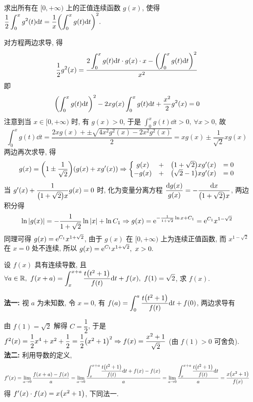 \begin{example}
    求出所有在 $[0,+\infty)$ 上的正值连续函数 $g(x)$, 使得 $\displaystyle\dfrac{1}{2}\int_{0}^{x}g^2(t)\dd t=\dfrac{1}{x}\qty(\int_{0}^{x}g(t)\dd t)^2.$
\end{example}
\begin{solution}
    对方程两边求导, 得 $$\dfrac{1}{2}g^2(x)=\dfrac{2\displaystyle\int_{0}^{x}g(t)\dd t\cdot g(x)\cdot x-\qty(\displaystyle\int_{0}^{x}g(t)\dd t)^2}{x^2}$$
    即 $$\qty(\int_{0}^{x}g(t)\dd t)^2-2xg(x)\int_{0}^{x}g(t)\dd t+\dfrac{x^2}{2}g^2(x)=0$$
    注意到当 $x\in[0,+\infty)$ 时, 有 $g(x)>0$, 于是 $\displaystyle\int_{0}^{x}g(t)\dd t>0,~\forall x>0$, 
    故 $$\int_{0}^{x}g(t)\dd t=\dfrac{2xg(x)+\pm\sqrt{4x^2g^2(x)-2x^2g^2(x)}}{2}=xg(x)\pm\dfrac{1}{\sqrt{2}}xg(x)$$
    两边再次求导, 得 $$g(x)=\qty(1\pm\dfrac{1}{\sqrt{2}})(g(x)+xg'(x))\Rightarrow\left\{\begin{matrix}
            g(x)  & + & \qty(1+\sqrt2)xg'(x) & =0 \\
            -g(x) & + & \qty(\sqrt2-1)xg'(x) & =0
        \end{matrix}\right.$$
    当 $g'(x)+\dfrac{1}{\qty(1+\sqrt{2})x}g(x)=0$ 时, 化为变量分离方程 $\dfrac{\dd g(x)}{g(x)}=-\dfrac{\dd x}{\qty(1+\sqrt{2})x}$, 两边积分得
    $$\ln|g(x)|=-\dfrac{1}{1+\sqrt{2}}\ln|x|+\ln C_1\Rightarrow g(x)=\mathrm{e} ^{-\frac{1}{1+\sqrt2}\ln x+C_1}=\mathrm{e} ^{C_1}x^{1-\sqrt2}$$
    同理可得 $g(x)=\mathrm{e} ^{C_1}x^{1+\sqrt2}$, 由于 $g(x)$ 在 $[0,+\infty)$ 上为连续正值函数, 而 $x^{1-\sqrt2}$ 在 $x=0$ 处不连续, 所以 $g(x)=\mathrm{e} ^{C_1}x^{1+\sqrt2},~x>0.$
\end{solution}

\begin{example}
    设 $f(x)$ 具有连续导数, 且 $\forall a\in\mathbb{R},~f(x+a)=\displaystyle\int_{x}^{x+a}\dfrac{t\qty(t^2+1)}{f(t)}\dd t+f(x),~f(1)=\sqrt{2}$, 求 $f(x)$.
\end{example}
\begin{solution}
    \textbf{法一: }视 $a$ 为未知数, 令 $x=0$, 有 $\displaystyle f(a)=\int_{0}^{a}\dfrac{t\qty(t^2+1)}{f(t)}\dd t+f(0)$, 两边求导有
    由 $f(1)=\sqrt{2}$ 解得 $C=\dfrac{1}{2}$, 于是 $f^2(x)=\dfrac{1}{2}x^4+x^2+\dfrac{1}{2}=\dfrac{1}{2}\qty(x^2+1)^2\Rightarrow f(x)=\dfrac{x^2+1}{\sqrt{2}}$ (由 $f(1)>0$ 可舍负).\\
    \textbf{法二: }利用导数的定义, 
    $$f'(x)=\lim_{a\to0}\dfrac{f(x+a)-f(x)}{a}=\lim_{a\to0}\dfrac{\displaystyle \int_{x}^{x+a}\dfrac{t\qty(t^2+1)}{f(t)}\dd t+f(x)-f(x)}{a}=\lim_{a\to0}\dfrac{\displaystyle \int_{x}^{x+a}\dfrac{t\qty(t^2+1)}{f(t)}\dd t}{a}=\dfrac{x\qty(x^2+1)}{f(x)}$$
    得 $f'(x)\cdot f(x)=x\qty(x^2+1)$, 下同法一.
\end{solution}

